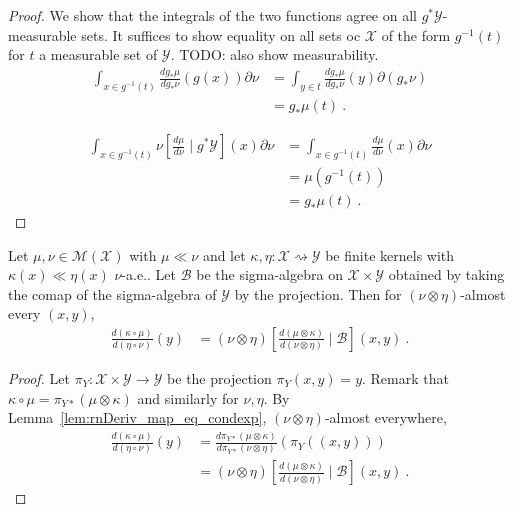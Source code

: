 \begin{proof}\leanok
\uses{}
We show that the integrals of the two functions agree on all $g^* \mathcal Y$-measurable sets. It suffices to show equality on all sets oc $\mathcal X$ of the form $g^{-1}(t)$ for $t$ a measurable set of $\mathcal Y$.
TODO: also show measurability.
\begin{align*}
\int_{x \in g^{-1}(t)}\frac{d g_*\mu}{d g_*\nu}(g(x)) \partial\nu
&= \int_{y \in t}\frac{d g_*\mu}{d g_*\nu}(y) \partial(g_*\nu)
\\
&= g_*\mu (t)
\: .
\end{align*}

\begin{align*}
\int_{x \in g^{-1}(t)}\nu\left[ \frac{d \mu}{d \nu} \mid g^* \mathcal Y\right](x) \partial\nu
&= \int_{x \in g^{-1}(t)}\frac{d \mu}{d \nu}(x) \partial\nu
\\
&= \mu(g^{-1}(t))
\\
&= g_*\mu(t)
\: .
\end{align*}


\end{proof}


\begin{lemma}
  \label{lem:rnDeriv_comp_eq_condexp}
  \leanok
  \uses{}
  Let $\mu, \nu \in \mathcal M(\mathcal X)$ with $\mu \ll \nu$ and let $\kappa, \eta : \mathcal X \rightsquigarrow \mathcal Y$ be finite kernels with $\kappa(x) \ll \eta(x)$ $\nu$-a.e..
  Let $\mathcal B$ be the sigma-algebra on $\mathcal X \times \mathcal Y$ obtained by taking the comap of the sigma-algebra of $\mathcal Y$ by the projection.
  Then for $(\nu \otimes \eta)$-almost every $(x,y)$,
  \begin{align*}
  \frac{d(\kappa \circ \mu)}{d(\eta \circ \nu)}(y)
  &= (\nu \otimes \eta)\left[ \frac{d (\mu \otimes \kappa)}{d (\nu \otimes \eta)} \mid \mathcal B \right](x,y)
  \: .
  \end{align*}
\end{lemma}

\begin{proof}\leanok
{}
Let $\pi_Y : \mathcal X \times \mathcal Y \to \mathcal Y$ be the projection $\pi_Y(x,y) = y$.
Remark that $\kappa \circ \mu = \pi_{Y*}(\mu \otimes \kappa)$ and similarly for $\nu, \eta$.
By Lemma~\ref{lem:rnDeriv_map_eq_condexp}, $(\nu \otimes \eta)$-almost everywhere,
\begin{align*}
\frac{d(\kappa \circ \mu)}{d(\eta \circ \nu)}(y)
&= \frac{d \pi_{Y*}(\mu \otimes \kappa)}{d \pi_{Y*}(\nu \otimes \eta)}(\pi_Y((x,y)))
\\
&= (\nu \otimes \eta)\left[ \frac{d (\mu \otimes \kappa)}{d (\nu \otimes \eta)} \mid \mathcal B\right](x,y)
\: .
\end{align*}
\end{proof}


